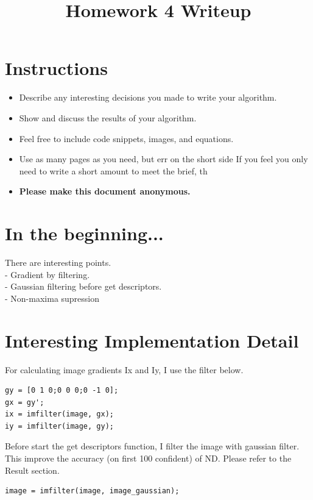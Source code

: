 \title{\vspace{-1cm}Homework 4 Writeup}



\maketitle
\vspace{-3cm}
\thispagestyle{fancy}

\section*{Instructions}
\begin{itemize}
  \item Describe any interesting decisions you made to write your algorithm.
  \item Show and discuss the results of your algorithm.
  \item Feel free to include code snippets, images, and equations.
  \item Use as many pages as you need, but err on the short side If you feel you only need to write a short amount to meet the brief, th
  
  \item \textbf{Please make this document anonymous.}
\end{itemize}

\section*{In the beginning...}

There are interesting points.\\
- Gradient by filtering.\\
- Gaussian filtering before get descriptors.\\
- Non-maxima supression
 
\section*{Interesting Implementation Detail}


For calculating image gradients Ix and Iy, I use the filter below.
\begin{lstlisting}[style=Matlab-editor]
gy = [0 1 0;0 0 0;0 -1 0];
gx = gy';
ix = imfilter(image, gx);
iy = imfilter(image, gy);
\end{lstlisting}

Before start the get descriptors function, I filter the image with gaussian filter. This improve the accuracy (on first 100 confident) of ND. Please refer to the Result section. 
\begin{lstlisting}[style=Matlab-editor]
image = imfilter(image, image_gaussian);
\end{lstlisting}

